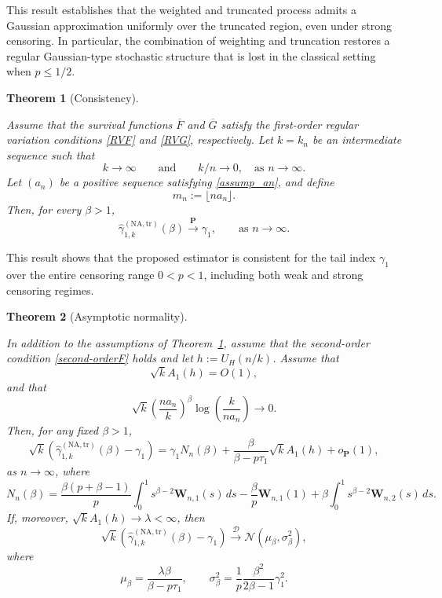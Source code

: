 \documentclass[reqno,openbib,runningheads,a4paper,12pt]{amsart}%
\newtheorem{theorem}{Theorem}[section]
\begin{document}
\noindent This result establishes that the weighted and truncated process
admits a Gaussian approximation uniformly over the truncated region, even
under strong censoring. In particular, the combination of weighting and
truncation restores a regular Gaussian-type stochastic structure that is lost
in the classical setting when $p\leq1/2$.

\begin{theorem}
[Consistency]\label{theorem2}

Assume that the survival functions $\overline{F}$ and $\overline{G}$ satisfy
the first-order regular variation conditions \eqref{RVF} and \eqref{RVG},
respectively. Let $k=k_{n}$ be an intermediate sequence such that
\[
k\to\infty\qquad\text{and} \qquad k/n\to0, \quad\text{as } n\to\infty.
\]
Let $(a_{n})$ be a positive sequence satisfying \eqref{assump_an}, and define
\[
m_{n} := \lfloor n a_{n} \rfloor.
\]
Then, for every $\beta>1$,
\[
\widehat{\gamma}_{1,k}^{(\mathrm{NA,tr})}(\beta) \overset{\mathbf{P}%
}{\longrightarrow} \gamma_{1}, \qquad\text{as } n\to\infty.
\]

\end{theorem}

\noindent This result shows that the proposed estimator is consistent for the
tail index $\gamma_{1}$ over the entire censoring range $0<p<1$, including
both weak and strong censoring regimes.

\begin{theorem}
[Asymptotic normality]\label{theorem3}

In addition to the assumptions of Theorem~\ref{theorem2}, assume that the
second-order condition \eqref{second-orderF} holds and let $h:=U_{H}(n/k)$.
Assume that
\[
\sqrt{k}A_{1}(h)=O(1),
\]
and that
\begin{equation}
\sqrt{k}\left(  \frac{na_{n}}{k}\right)  ^{\beta}\log\!\left(  \frac{k}%
{na_{n}}\right)  \rightarrow0. \label{supplementary_assumption}%
\end{equation}
Then, for any fixed $\beta>1$,
\[
\sqrt{k}\left(  \widehat{\gamma}_{1,k}^{(\mathrm{NA,tr})}(\beta)-\gamma
_{1}\right)  =\gamma_{1}N_{n}(\beta)+\frac{\beta}{\beta-p\tau_{1}}\sqrt
{k}A_{1}(h)+o_{\mathbf{P}}(1),
\]
as $n\rightarrow\infty$, where
\[
N_{n}(\beta)=\frac{\beta(p+\beta-1)}{p}\int_{0}^{1}s^{\beta-2}\mathbf{W}%
_{n,1}(s)\,ds-\frac{\beta}{p}\mathbf{W}_{n,1}(1)+\beta\int_{0}^{1}s^{\beta
-2}\mathbf{W}_{n,2}(s)\,ds.
\]
If, moreover, $\sqrt{k}A_{1}(h)\rightarrow\lambda<\infty$, then
\[
\sqrt{k}\left(  \widehat{\gamma}_{1,k}^{(\mathrm{NA,tr})}(\beta)-\gamma
_{1}\right)  \overset{\mathcal{D}}{\longrightarrow}\mathcal{N}(\mu_{\beta
},\sigma_{\beta}^{2}),
\]
where
\[
\mu_{\beta}=\frac{\lambda\beta}{\beta-p\tau_{1}},\qquad\sigma_{\beta}%
^{2}=\frac{1}{p}\frac{\beta^{2}}{2\beta-1}\gamma_{1}^{2}.
\]

\end{theorem}
\end{document}
